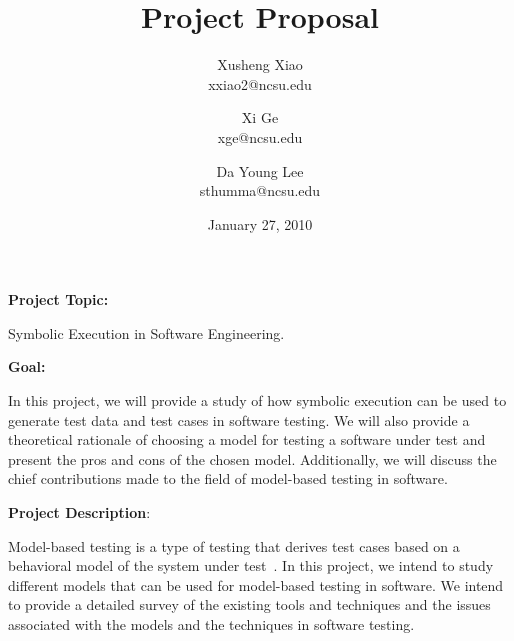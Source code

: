 \documentclass[times, 10pt,onecolumn]{article}
\title{Project Proposal}
\author{
Xusheng Xiao\\
\small{xxiao2@ncsu.edu}\\
\and
Xi Ge\\
\small{xge@ncsu.edu}\\
\and
Da Young Lee\\
\small{sthumma@ncsu.edu}
}
\date{January 27, 2010}
\begin{document}
\maketitle

\begin{flushleft}
\textbf{Project Topic:}\end{flushleft} Symbolic Execution in Software Engineering.\\

\begin{flushleft}
\textbf{Goal:}\end{flushleft}In this project, we will provide a study of how symbolic execution can be used to generate test data and test cases in software testing. We will also provide a theoretical rationale of choosing a model for testing a software under test and present the pros and cons of the chosen model. Additionally, we will discuss the chief contributions made to the field of model-based testing in software.\\

\begin{flushleft}
\textbf{Project Description}:\end{flushleft}Model-based testing is a type of testing that derives test cases based on a behavioral model of the system under test~\cite{Utting2006}. In this project, we intend to study different models that can be used for model-based testing in software. We intend to provide a detailed survey of the existing tools and techniques and the issues associated with the models and the techniques in software testing.
\end{document}
